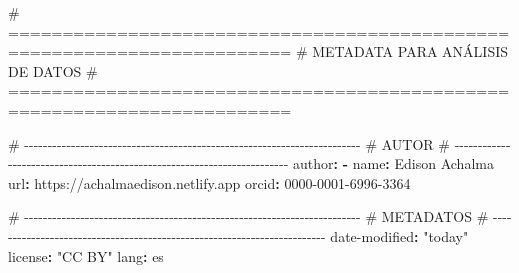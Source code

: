 \documentclass[
  doc,
  floatsintext,
  longtable,
  a4paper,
  nolmodern,
  notxfonts,
  notimes,
  12pt,
  colorlinks=true,linkcolor=blue,citecolor=blue,urlcolor=blue]{apa7}
\newenvironment{Shaded}{\begin{snugshade}}{\end{snugshade}}
\newcommand{\AttributeTok}[1]{\textcolor[rgb]{0.40,0.45,0.13}{#1}}
\newcommand{\CommentTok}[1]{\textcolor[rgb]{0.37,0.37,0.37}{#1}}
\newcommand{\FunctionTok}[1]{\textcolor[rgb]{0.28,0.35,0.67}{#1}}
\newcommand{\KeywordTok}[1]{\textcolor[rgb]{0.00,0.23,0.31}{\textbf{#1}}}
\newcommand{\StringTok}[1]{\textcolor[rgb]{0.13,0.47,0.30}{#1}}
\begin{document}
\begin{Shaded}
\begin{Highlighting}[]
\CommentTok{\# ========================================================================}
\CommentTok{\# METADATA PARA ANÁLISIS DE DATOS}
\CommentTok{\# ========================================================================}

\CommentTok{\# {-}{-}{-}{-}{-}{-}{-}{-}{-}{-}{-}{-}{-}{-}{-}{-}{-}{-}{-}{-}{-}{-}{-}{-}{-}{-}{-}{-}{-}{-}{-}{-}{-}{-}{-}{-}{-}{-}{-}{-}{-}{-}{-}{-}{-}{-}{-}{-}{-}{-}{-}{-}{-}{-}{-}{-}{-}{-}{-}{-}{-}{-}{-}{-}{-}{-}{-}{-}{-}{-}{-}{-}}
\CommentTok{\# AUTOR}
\CommentTok{\# {-}{-}{-}{-}{-}{-}{-}{-}{-}{-}{-}{-}{-}{-}{-}{-}{-}{-}{-}{-}{-}{-}{-}{-}{-}{-}{-}{-}{-}{-}{-}{-}{-}{-}{-}{-}{-}{-}{-}{-}{-}{-}{-}{-}{-}{-}{-}{-}{-}{-}{-}{-}{-}{-}{-}{-}{-}{-}{-}{-}{-}{-}{-}{-}{-}{-}{-}{-}{-}{-}{-}{-}}
\FunctionTok{author}\KeywordTok{:}
\AttributeTok{  }\KeywordTok{{-}}\AttributeTok{ }\FunctionTok{name}\KeywordTok{:}\AttributeTok{ Edison Achalma}
\AttributeTok{    }\FunctionTok{url}\KeywordTok{:}\AttributeTok{ https://achalmaedison.netlify.app}
\AttributeTok{    }\FunctionTok{orcid}\KeywordTok{:}\AttributeTok{ 0000{-}0001{-}6996{-}3364}

\CommentTok{\# {-}{-}{-}{-}{-}{-}{-}{-}{-}{-}{-}{-}{-}{-}{-}{-}{-}{-}{-}{-}{-}{-}{-}{-}{-}{-}{-}{-}{-}{-}{-}{-}{-}{-}{-}{-}{-}{-}{-}{-}{-}{-}{-}{-}{-}{-}{-}{-}{-}{-}{-}{-}{-}{-}{-}{-}{-}{-}{-}{-}{-}{-}{-}{-}{-}{-}{-}{-}{-}{-}{-}{-}}
\CommentTok{\# METADATOS}
\CommentTok{\# {-}{-}{-}{-}{-}{-}{-}{-}{-}{-}{-}{-}{-}{-}{-}{-}{-}{-}{-}{-}{-}{-}{-}{-}{-}{-}{-}{-}{-}{-}{-}{-}{-}{-}{-}{-}{-}{-}{-}{-}{-}{-}{-}{-}{-}{-}{-}{-}{-}{-}{-}{-}{-}{-}{-}{-}{-}{-}{-}{-}{-}{-}{-}{-}{-}{-}{-}{-}{-}{-}{-}{-}}
\FunctionTok{date{-}modified}\KeywordTok{:}\AttributeTok{ }\StringTok{"today"}
\FunctionTok{license}\KeywordTok{:}\AttributeTok{ }\StringTok{"CC BY"}
\FunctionTok{lang}\KeywordTok{:}\AttributeTok{ es}


\end{Highlighting}
\end{Shaded}
\end{document}

